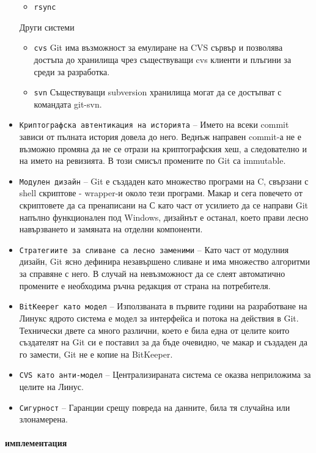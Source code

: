 \documentclass[a4paper]{article}
\begin{document}
\begin{itemize}
\begin{itemize}
          \item \texttt{rsync}
        \end{itemize}
        Други системи
        \begin{itemize}
          \item \texttt{cvs} Git има възможност за емулиране на CVS сървър и позволява достъпа до хранилища чрез съществуващи cvs клиенти и плъгини за среди за разработка.
          \item \texttt{svn} Съществуващи subversion хранилища могат да се достъпват с командата git-svn.
        \end{itemize}
      \item \texttt{Криптографска автентикация на историята} -- Името на всеки commit зависи от пълната история довела до него. Веднъж направен commit-а не е възможно промяна да не се отрази на криптографския хеш, а следователно и на името на ревизията. В този смисъл промените по Git са immutable.
      \item \texttt{Модулен дизайн} -- Git е създаден като множество програми на C, свързани с shell скриптове - wrapper-и около тези програми. Макар и сега повечето от скриптовете да са пренаписани на С като част от усилието да се направи Git напълно функционален под Windows, дизайнът е останал, което прави лесно навързването и замяната на отделни компоненти.
      \item \texttt{Стратегиите за сливане са лесно заменими} -- Като част от модулния дизайн, Git ясно дефинира незавършено сливане и има множество алгоритми за справяне с него. В случай на невъзможност да се слеят автоматично промените е необходима ръчна редакция от страна на потребителя.
      \item \texttt{BitKeeper като модел} -- Използваната в първите години на разработване на Линукс ядрото система е модел за интерфейса и потока на действия в Git. Технически двете са много различни, което е била една от целите които създателят на Git си е поставил за да бъде очевидно, че макар и създаден да го замести, Git не е копие на BitKeeper.
      \item \texttt{CVS като анти-модел} -- Централизираната система се оказва неприложима за целите на Линус.
      \item \texttt{Сигурност} -- Гаранции срещу повреда на данните, била тя случайна или злонамерена.
    \end{itemize}

    \paragraph{имплементация}
      
\end{document}
